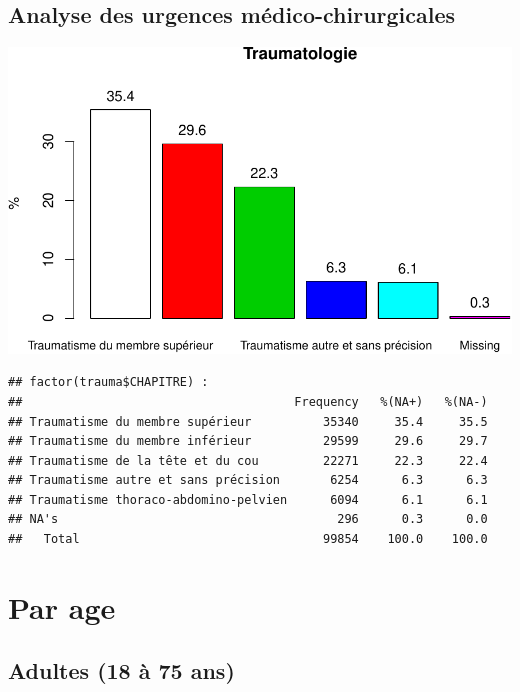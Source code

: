 \documentclass[]{article}
\newenvironment{Shaded}{\begin{snugshade}}{\end{snugshade}}
\newcommand{\KeywordTok}[1]{\textcolor[rgb]{0.13,0.29,0.53}{\textbf{{#1}}}}
\newcommand{\DecValTok}[1]{\textcolor[rgb]{0.00,0.00,0.81}{{#1}}}
\newcommand{\StringTok}[1]{\textcolor[rgb]{0.31,0.60,0.02}{{#1}}}
\newcommand{\CommentTok}[1]{\textcolor[rgb]{0.56,0.35,0.01}{\textit{{#1}}}}
\newcommand{\NormalTok}[1]{{#1}}
\begin{document}
\subsection{Analyse des urgences
médico-chirurgicales}\label{analyse-des-urgences-medico-chirurgicales-1}

\includegraphics{analyse_merge_files/figure-latex/urg_traumato-1.pdf}

\begin{verbatim}
## factor(trauma$CHAPITRE) : 
##                                      Frequency   %(NA+)   %(NA-)
## Traumatisme du membre supérieur          35340     35.4     35.5
## Traumatisme du membre inférieur          29599     29.6     29.7
## Traumatisme de la tête et du cou         22271     22.3     22.4
## Traumatisme autre et sans précision       6254      6.3      6.3
## Traumatisme thoraco-abdomino-pelvien      6094      6.1      6.1
## NA's                                       296      0.3      0.0
##   Total                                  99854    100.0    100.0
\end{verbatim}

\section{Par age}\label{par-age}

\subsection{Adultes (18 à 75 ans)}\label{adultes-18-a-75-ans}

\begin{Shaded}
\end{Shaded}
\end{document}
